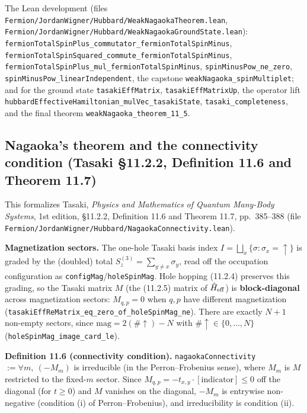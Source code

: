 \documentclass[a4paper,11pt]{article}
\begin{document}
\medskip
\noindent The Lean development
(files \texttt{Fermion/JordanWigner/Hubbard/WeakNagaokaTheorem.lean},
\texttt{Fermion/JordanWigner/Hubbard/WeakNagaokaGroundState.lean}):
\texttt{fermionTotalSpinPlus\_commutator\_fermionTotalSpinMinus},
\texttt{fermionTotalSpinSquared\_commute\_fermionTotalSpinMinus},
\texttt{fermionTotalSpinPlus\_mul\_fermionTotalSpinMinus},
\texttt{spinMinusPow\_ne\_zero}, \texttt{spinMinusPow\_linearIndependent},
the capstone \texttt{weakNagaoka\_spinMultiplet}; and for the ground state
\texttt{tasakiEffMatrix}, \texttt{tasakiEffMatrixUp}, the operator lift
\texttt{hubbardEffectiveHamiltonian\_mulVec\_tasakiState}, \texttt{tasaki\_completeness},
and the final theorem \texttt{weakNagaoka\_theorem\_11\_5}.

\subsection{Nagaoka's theorem and the connectivity condition
  (Tasaki §11.2.2, Definition 11.6 and Theorem 11.7)}
\label{subsec:nagaoka-theorem-11-7}

\noindent This formalizes Tasaki, \emph{Physics and Mathematics of Quantum
Many-Body Systems}, 1st edition, §11.2.2, Definition 11.6 and Theorem 11.7,
pp.~385--388 (file
\texttt{Fermion/JordanWigner/Hubbard/NagaokaConnectivity.lean}).

\medskip
\noindent\textbf{Magnetization sectors.}
The one-hole Tasaki basis index \(I = \bigsqcup_x \{\sigma : \sigma_x = \uparrow\}\)
is graded by the (doubled) total \(S_z^{(3)} = \sum_{y \ne x}\sigma_y\), read off
the occupation configuration as \texttt{configMag}/\texttt{holeSpinMag}. Hole
hopping (11.2.4) preserves this grading, so the Tasaki matrix \(M\) (the
(11.2.5) matrix of \(\hat H_{\rm eff}\)) is \textbf{block-diagonal} across
magnetization sectors: \(M_{q,p} = 0\) when \(q,p\) have different magnetization
(\texttt{tasakiEffReMatrix\_eq\_zero\_of\_holeSpinMag\_ne}). There are exactly
\(N+1\) non-empty sectors, since \(\text{mag} = 2(\#\!\uparrow) - N\) with
\(\#\!\uparrow \in \{0,\dots,N\}\) (\texttt{holeSpinMag\_image\_card\_le}).

\medskip
\noindent\textbf{Definition 11.6 (connectivity condition).}
\texttt{nagaokaConnectivity} \(:= \forall m,\ (-M_m)\) is irreducible (in the
Perron--Frobenius sense), where \(M_m\) is \(M\) restricted to the fixed-\(m\)
sector. Since \(M_{q,p} = -t_{x,y}\cdot[\text{indicator}] \le 0\) off the
diagonal (for \(t \ge 0\)) and \(M\) vanishes on the diagonal, \(-M_m\) is
entrywise non-negative (condition (i) of Perron--Frobenius), and irreducibility
is condition (ii).
\end{document}
